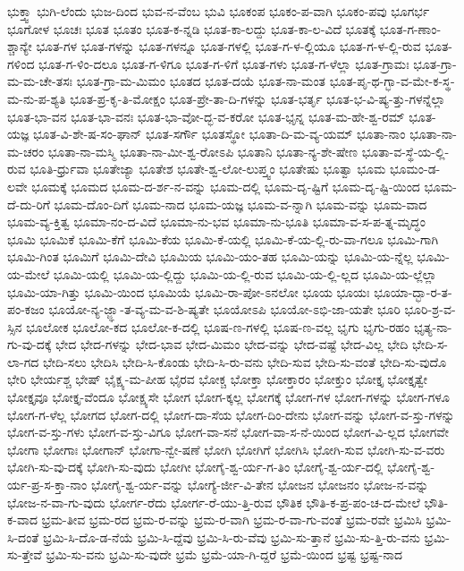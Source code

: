 {ಭುಕ್ತ್ವಾ
ಭುಗಿ-ಲೆಂದು
ಭುಜ-ದಿಂದ
ಭುವ-ನ-ವೆಂಬ
ಭುವಿ
ಭೂಕಂಪ
ಭೂಕಂ-ಪ-ವಾಗಿ
ಭೂಕಂ-ಪವು
ಭೂಗರ್ಭ
ಭೂಗೋಳ
ಭೂಚಃ
ಭೂತ
ಭೂತಂ
ಭೂತ-ಕ-ನ್ನಡಿ
ಭೂತ-ಕಾ-ಲದ್ದು
ಭೂತ-ಕಾ-ಲ-ವಿದೆ
ಭೂತಕ್ಕೆ
ಭೂತ-ಗ-ಣಾಂ-ಶ್ಚಾನ್ಯೇ
ಭೂತ-ಗಳ
ಭೂತ-ಗಳನ್ನು
ಭೂತ-ಗಳನ್ನೂ
ಭೂತ-ಗಳಲ್ಲಿ
ಭೂತ-ಗ-ಳ-ಲ್ಲಿಯೂ
ಭೂತ-ಗ-ಳ-ಲ್ಲಿ-ರುವ
ಭೂತ-ಗಳಿಂದ
ಭೂತ-ಗ-ಳಿಂ-ದಲೂ
ಭೂತ-ಗ-ಳಿಗೂ
ಭೂತ-ಗ-ಳಿಗೆ
ಭೂತ-ಗಳು
ಭೂತ-ಗ-ಳೆಲ್ಲಾ
ಭೂತ-ಗ್ರಾಮಃ
ಭೂತ-ಗ್ರಾ-ಮ-ಮ-ಚೇ-ತಸಃ
ಭೂತ-ಗ್ರಾ-ಮ-ಮಿಮಂ
ಭೂತದ
ಭೂತ-ದಯೆ
ಭೂತ-ನಾ-ಮಂತ
ಭೂತ-ಪೃ-ಥ-ಗ್ಭಾ-ವ-ಮೇ-ಕ-ಸ್ಥ-ಮ-ನು-ಪ-ಶ್ಯತಿ
ಭೂತ-ಪ್ರ-ಕೃ-ತಿ-ಮೋಕ್ಷಂ
ಭೂತ-ಪ್ರೇ-ತಾ-ದಿ-ಗಳನ್ನು
ಭೂತ-ಭರ್ತೃ
ಭೂತ-ಭ-ವಿ-ಷ್ಯ-ತ್ತು-ಗಳನ್ನೆಲ್ಲಾ
ಭೂತ-ಭಾ-ವನ
ಭೂತ-ಭಾ-ವನಃ
ಭೂತ-ಭಾ-ವೋ-ದ್ಭ-ವ-ಕರೋ
ಭೂತ-ಭೃನ್ನ
ಭೂತ-ಮ-ಹೇ-ಶ್ವ-ರಮ್
ಭೂತ-ಯಜ್ಞ
ಭೂತ-ವಿ-ಶೇ-ಷ-ಸಂ-ಘಾನ್
ಭೂತ-ಸರ್ಗೌ
ಭೂತಸ್ಥೋ
ಭೂತಾ-ದಿ-ಮ-ವ್ಯ-ಯಮ್
ಭೂತಾ-ನಾಂ
ಭೂತಾ-ನಾ-ಮ-ಚರಂ
ಭೂತಾ-ನಾ-ಮಸ್ಮಿ
ಭೂತಾ-ನಾ-ಮೀ-ಶ್ವ-ರೋಽಪಿ
ಭೂತಾನಿ
ಭೂತಾ-ನ್ಯ-ಶೇ-ಷೇಣ
ಭೂತಾ-ವ-ಸ್ಥೆ-ಯ-ಲ್ಲಿ-ರುವ
ಭೂತಿ-ರ್ಧ್ರುವಾ
ಭೂತೇಜ್ಯಾ
ಭೂತೇಶ
ಭೂತೇ-ಶ್ವ-ಲೋ-ಲುಪ್ತ್ವಂ
ಭೂತೇಷು
ಭೂತ್ವಾ
ಭೂಮ
ಭೂಮಂ-ಡ-ಲವೇ
ಭೂಮಕ್ಕೆ
ಭೂಮದ
ಭೂಮ-ದ-ರ್ಶ-ನ-ವನ್ನು
ಭೂಮ-ದಲ್ಲಿ
ಭೂಮ-ದೃ-ಷ್ಟಿಗೆ
ಭೂಮ-ದೃ-ಷ್ಟಿ-ಯಿಂದ
ಭೂಮ-ದೆ-ದು-ರಿಗೆ
ಭೂಮ-ದೊಂ-ದಿಗೆ
ಭೂಮ-ನಾದ
ಭೂಮ-ಯಜ್ಞ
ಭೂಮ-ವ-ನ್ನಾಗಿ
ಭೂಮ-ವನ್ನು
ಭೂಮ-ವಾದ
ಭೂಮ-ವ್ಯ-ಕ್ತಿತ್ವ
ಭೂಮಾ-ನಂ-ದ-ವಿದೆ
ಭೂಮಾ-ನು-ಭವ
ಭೂಮಾ-ನು-ಭೂತಿ
ಭೂಮಾ-ವ-ಸ-ಪ-ತ್ನ-ಮೃದ್ಧಂ
ಭೂಮಿ
ಭೂಮಿಕೆ
ಭೂಮಿ-ಕೆಗೆ
ಭೂಮಿ-ಕೆಯ
ಭೂಮಿ-ಕೆ-ಯಲ್ಲಿ
ಭೂಮಿ-ಕೆ-ಯ-ಲ್ಲಿ-ರು-ವಾ-ಗಲೂ
ಭೂಮಿ-ಗಾಗಿ
ಭೂಮಿ-ಗಿಂತ
ಭೂಮಿಗೆ
ಭೂಮಿ-ದೇವಿ
ಭೂಮಿಯ
ಭೂಮಿ-ಯಂ-ತಹ
ಭೂಮಿ-ಯನ್ನು
ಭೂಮಿ-ಯ-ನ್ನೆಲ್ಲ
ಭೂಮಿ-ಯ-ಮೇಲೆ
ಭೂಮಿ-ಯಲ್ಲಿ
ಭೂಮಿ-ಯ-ಲ್ಲಿದ್ದು
ಭೂಮಿ-ಯ-ಲ್ಲಿ-ರುವ
ಭೂಮಿ-ಯ-ಲ್ಲಿ-ಲ್ಲದ
ಭೂಮಿ-ಯ-ಲ್ಲೆಲ್ಲಾ
ಭೂಮಿ-ಯಾ-ಗಿತ್ತು
ಭೂಮಿ-ಯಿಂದ
ಭೂಮಿಯೆ
ಭೂಮಿ-ರಾ-ಪೋ-ಽನಲೋ
ಭೂಯ
ಭೂಯಃ
ಭೂಯಾ-ದ್ಭಾ-ರ-ತ-ಪಂ-ಕಜಂ
ಭೂಯೋ-ನ್ಯ-ಜ್ಜ್ಞಾ-ತ-ವ್ಯ-ಮ-ವ-ಶಿ-ಷ್ಯತೇ
ಭೂಯೋಽಪಿ
ಭೂಯೋ-ಽಭಿ-ಜಾ-ಯತೇ
ಭೂರಿ
ಭೂರಿ-ಶ್ರ-ವ-ಸ್ಸಿನ
ಭೂಲೋಕ
ಭೂಲೋ-ಕದ
ಭೂಲೋ-ಕ-ದಲ್ಲಿ
ಭೂಷ-ಣ-ಗಳಲ್ಲಿ
ಭೂಷ-ಣ-ವಲ್ಲ
ಭೃಗು
ಭೃಗು-ರಹಂ
ಭೃತ್ಯ-ನಾ-ಗು-ವು-ದಕ್ಕೆ
ಭೇದ
ಭೇದ-ಗಳನ್ನು
ಭೇದ-ಭಾವ
ಭೇದ-ಮಿಮಂ
ಭೇದ-ವನ್ನು
ಭೇದ-ವಷ್ಟೆ
ಭೇದ-ವಿಲ್ಲ
ಭೇದಿ
ಭೇದಿ-ಸ-ಲಾ-ಗದ
ಭೇದಿ-ಸಲು
ಭೇದಿಸಿ
ಭೇದಿ-ಸಿ-ಕೊಂಡು
ಭೇದಿ-ಸಿ-ರು-ವನು
ಭೇದಿ-ಸುವ
ಭೇದಿ-ಸು-ವಂತೆ
ಭೇದಿ-ಸು-ವುದೊ
ಭೇರಿ
ಭೇರ್ಯಶ್ಚ
ಭೇಷ್
ಭೈಕ್ಷ್ಯ-ಮ-ಪೀಹ
ಭೈರವ
ಭೋಕ್ಚ
ಭೋಕ್ತಾ
ಭೋಕ್ತಾರಂ
ಭೋಕ್ತುಂ
ಭೋಕ್ತೃ
ಭೋಕ್ತೃತ್ವೇ
ಭೋಕ್ತೃವೂ
ಭೋಕ್ತೃ-ವೆಂದೂ
ಭೋಕ್ಷ್ಯಸೇ
ಭೋಗ
ಭೋಗ-ಕ್ಕಲ್ಲ
ಭೋಗಕ್ಕೆ
ಭೋಗ-ಗಳ
ಭೋಗ-ಗಳನ್ನು
ಭೋಗ-ಗಳೂ
ಭೋಗ-ಗ-ಳೆಲ್ಲ
ಭೋಗದ
ಭೋಗ-ದಲ್ಲಿ
ಭೋಗ-ದಾ-ಸೆಯ
ಭೋಗ-ದಿಂ-ದೇನು
ಭೋಗ-ವನ್ನು
ಭೋಗ-ವ-ಸ್ತು-ಗಳನ್ನು
ಭೋಗ-ವ-ಸ್ತು-ಗಳು
ಭೋಗ-ವ-ಸ್ತು-ವಿಗೂ
ಭೋಗ-ವಾ-ಸನೆ
ಭೋಗ-ವಾ-ಸ-ನೆ-ಯಿಂದ
ಭೋಗ-ವಿ-ಲ್ಲದ
ಭೋಗವೇ
ಭೋಗಾ
ಭೋಗಾಃ
ಭೋಗಾನ್
ಭೋಗಾ-ನ್ವೇ-ಷಣೆ
ಭೋಗಿ
ಭೋಗಿಗೆ
ಭೋಗಿಸಿ
ಭೋಗಿ-ಸುವ
ಭೋಗಿ-ಸು-ವ-ವರು
ಭೋಗಿ-ಸು-ವು-ದಕ್ಕೆ
ಭೋಗಿ-ಸು-ವುದು
ಭೋಗೀ
ಭೋಗೈ-ಶ್ವ-ರ್ಯ-ಗ-ತಿಂ
ಭೋಗೈ-ಶ್ವ-ರ್ಯ-ದಲ್ಲಿ
ಭೋಗೈ-ಶ್ವ-ರ್ಯ-ಪ್ರ-ಸ-ಕ್ತಾ-ನಾಂ
ಭೋಗೈ-ಶ್ವ-ರ್ಯ-ವನ್ನು
ಭೋಗ್ಯೆ-ರ್ಜೀ-ವಿ-ತೇನ
ಭೋಜನ
ಭೋಜನಂ
ಭೋಜ-ನ-ವನ್ನು
ಭೋಜ-ನ-ವಾ-ಗು-ವುದು
ಭೋರ್ಗ-ರೆದು
ಭೋರ್ಗ-ರೆ-ಯು-ತ್ತಿ-ರುವ
ಭೌತಿಕ
ಭೌತಿ-ಕ-ಪ್ರ-ಪಂ-ಚ-ದ-ಮೇಲೆ
ಭೌತಿ-ಕ-ವಾದ
ಭ್ರಮ-ತೀವ
ಭ್ರಮ-ರದ
ಭ್ರಮ-ರ-ವನ್ನು
ಭ್ರಮ-ರ-ವಾಗಿ
ಭ್ರಮ-ರ-ವಾ-ಗು-ವಂತೆ
ಭ್ರಮ-ರವೇ
ಭ್ರಮಿಸಿ
ಭ್ರಮಿ-ಸಿ-ದಂತೆ
ಭ್ರಮಿ-ಸಿ-ದೊ-ಡ-ನೆಯೆ
ಭ್ರಮಿ-ಸಿ-ದ್ದೆವು
ಭ್ರಮಿ-ಸಿ-ರು-ವೆವು
ಭ್ರಮಿ-ಸು-ತ್ತಾನೆ
ಭ್ರಮಿ-ಸು-ತ್ತಿ-ರು-ವನು
ಭ್ರಮಿ-ಸು-ತ್ತೇವೆ
ಭ್ರಮಿ-ಸು-ವನು
ಭ್ರಮಿ-ಸು-ವುದೇ
ಭ್ರಮೆ
ಭ್ರಮೆ-ಯಾ-ಗಿ-ದ್ದರೆ
ಭ್ರಮೆ-ಯಿಂದ
ಭ್ರಷ್ಟ
ಭ್ರಷ್ಟ-ನಾದ
}
